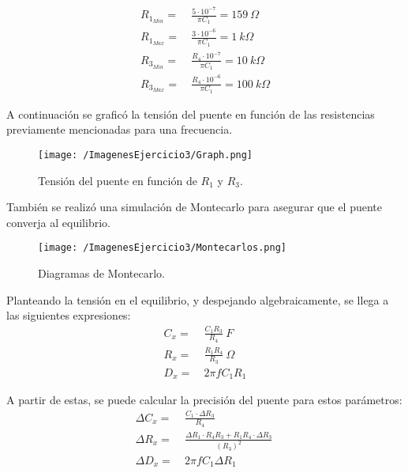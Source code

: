 \begin{equation*}
\begin{split}
	R_{1_{Min}} =& \ \frac{5 \cdot 10^{-7}}{\pi C_1} = 159 \ \Omega \\
	R_{1_{Max}} =& \ \frac{3 \cdot 10^{-6}}{\pi C_1} = 1 \ k\Omega \\
	R_{3_{Min}} =& \ \frac{R_4 \cdot 10^{-7}}{\pi C_1} = 10 \ k\Omega \\
	R_{3_{Max}} =& \ \frac{R_4 \cdot 10^{-6}}{\pi C_1} = 100 \ k\Omega
\end{split}
\end{equation*}



A continuación se  graficó la tensión del puente en función de las resistencias previamente mencionadas para una frecuencia.
\begin{figure}[H]
	\centering
	\texttt{[image: /ImagenesEjercicio3/Graph.png]}
	\caption{Tensión del puente en función de $R_1$ y $R_3$.}
	\label{fig:graph1}
\end{figure}

También se realizó una simulación de Montecarlo para asegurar que el puente converja al equilibrio.
\begin{figure}[H]
	\centering
	\texttt{[image: /ImagenesEjercicio3/Montecarlos.png]}
	\caption{Diagramas de Montecarlo.}	
	\label{fig:graph2}
\end{figure}

Planteando la tensión en el equilibrio, y despejando algebraicamente, se llega a las siguientes expresiones:
\begin{equation*}
\begin{split}
	C_{x} =& \ \frac{C_1R_3}{R_4}\ F \\
	R_{x} =& \ \frac{R_1R_4}{R_3}\ \Omega \\
	D_{x} =& \ 2\pi f C_1R_1 
\end{split}
\end{equation*}

A partir de estas, se puede calcular la precisión del puente para estos parámetros:
\begin{equation*}
\begin{split}
	\Delta C_{x} =& \ \frac{C_1 \cdot \Delta R_3}{R_4}\  \\
	\Delta R_{x} =& \ \frac{\Delta R_1 \cdot R_4  R_3+R_1  R_4 \cdot \Delta R_3}{(R_3)^2}\  \\
	\Delta D_{x} =& \ 2\pi f C_1 \Delta R_1 
\end{split}
\end{equation*}


